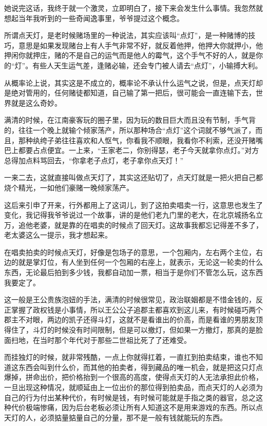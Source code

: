她说完这话，我终于就一个激灵，立即明白了，接下来会发生什么事情。我忽然就想起当年我听到的一些奇闻逸事里，爷爷提过这个概念。

所谓点天灯，是老时候赌场里的一种说法，其实应该叫“点灯”，是一种赌博的技巧，意思是如果发现赌台上有人手气非常不好，就反着他押，他押大你就押小，他押闲你就押庄，赌的不是自己的运气而是他人的霉气，这个手气不好的人，就是你的“灯”。有些人天生运气差，逢赌必输，还会专门被人请去“点灯”，小输搏大利。

从概率论上说，其实这是不成立的，概率论不承认什么运气之说，但是，点天灯却是绝对管用的，任何赌徒都知道，自己输了第一把后，很可能会一直连输下去，世界就是这么奇妙。

满清的时候，在江南豪客玩的圈子里，因为玩的数目巨大而且没有节制，手气背的，往往一个晚上就输个倾家荡产，所以那种场合“点灯”这个词就不够气派了，而且，那种纨绔子弟往往喜欢和人怄气，你看我不顺眼，我看你不利索，还没开赌嘴巴上都要占点便宜。一上来，“王家老二，你别得瑟，老子今天就拿你点灯。”对方总得加点料骂回去，“你拿老子点灯，老子拿你点天灯！”

一来二去，这就直接叫做点天灯了，其实这还贴切了，点天灯就是一把火把自己都烧个精光，一如他们豪赌一晚倾家荡产。

这后来引申了开来，行外都用上了这词儿，到了这拍卖唱卖一行，这意思也发生了变化，我记得我爷爷说过一个故事，讲的是他们老九门里的老大，在北京城扬名立万，追他老婆，就是靠的在唱卖的时候点了回天灯。这故事我都忘记得差不多了，老太婆这么一提示，我才想起来。

在唱卖拍卖的时候点天灯，好像是包场子的意思，一个包厢内，左右两个主位，右边的就是掌灯位，有人坐到任何一个包厢的右座上，就表示，无论这一轮卖的什么东西，无论最后拍到多少钱，我都自动加一票，相当于是你们不管怎么玩，这东西我要定了。

这一般是王公贵族泡妞的手法，满清的时候很常见，政治联姻都是不惜金钱的，反正掌握了政权钱是小事情，所以王公公子追郡主都喜欢到这儿来，有时候碰巧两个郡主不对眼，两边的凯子还得斗灯，这就不是看谁出的价高，而是看谁的男朋友顶得住了，斗灯的时候没有时间限制，但是可以撤灯，但如果一方撤灯，那真的是脸面扫地，在当时那个年代对于那些二世祖比死了了还难受。

而挂独灯的时候，就非常残酷，一点上你就得扛着，一直扛到拍卖结束，谁也不知道这东西会叫到什么价，而其他的拍卖者，得到藏品的唯一机会，就是把这只灯点爆掉，拼命出价，把价格抬到一个很高的高度，使得点天灯的人无法承担此价格，一旦出现这种情况，就顺延由上一位出价的那位得到拍卖品，而点天灯的人必须为自己的行为付出某种代价，有时候是钱，有时候可能就是手指之类的器官，总之这种代价极端惨痛，因为后台老板必须让所有人知道这不是用来游戏的东西。所以点天灯的人，必须掂量掂量自己的分量，那不是一般有钱就能玩的东西。

